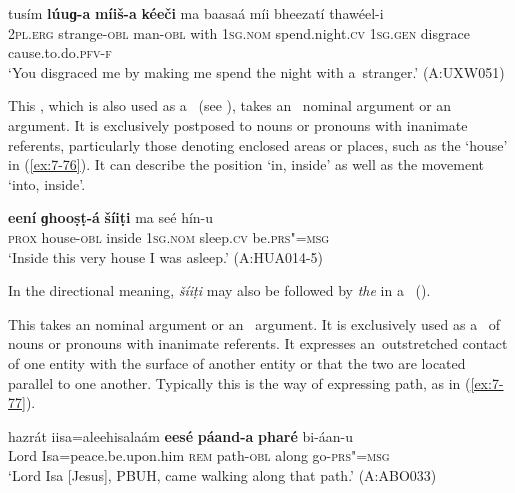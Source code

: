 \begin{exe}
\largerpage
\ea
\label{ex:7-75}
\gll tusím \textbf{lúuɡ-a} \textbf{míiš-a} \textbf{kéeči} ma baasaá míi bheezatí thawéel-i \\
\textsc{2pl.erg} strange-\textsc{obl} man-\textsc{obl} with \textsc{1sg.nom} spend.night.\textsc{cv} \textsc{1sg.gen} disgrace cause.to.do.\textsc{pfv-f} \\
\glt `You disgraced me by making me spend the night with a~stranger.' (A:UXW051)
\z




 This , which is also used as a~ (see ), takes an~ nominal argument or an~  argument. It is exclusively postposed to nouns or pronouns with inanimate referents, particularly those denoting enclosed areas or places, such as the `house' in (\ref{ex:7-76}). It can describe the position `in, inside' as well as the movement `into, inside'.

\begin{exe}
\ex
\label{ex:7-76}
\gll \textbf{eení} \textbf{ɡhooṣṭ-á} \textbf{šíiṭi} ma seé hín-u  \\
\textsc{prox} house-\textsc{obl}  inside \textsc{1sg.nom} sleep.\textsc{cv} be.\textsc{prs"=msg}  \\
\glt `Inside this very house I was asleep.' (A:HUA014-5)
\end{exe}

In the directional meaning, \textit{šíiṭi} may also be followed by \textit{the} in a~ ().


 This  takes an  nominal argument or an~  argument. It is exclusively used as a~ of nouns or pronouns with inanimate referents. It expresses an~outstretched contact of one entity with the surface of another entity or that the two are located parallel to one another. Typically this is the way of expressing path, as in (\ref{ex:7-77}).

\begin{exe}
\ex
\label{ex:7-77}
\gll hazrát iisa=aleehisalaám \textbf{eesé} \textbf{páand-a} \textbf{pharé} bi-áan-u\\
Lord Isa=peace.be.upon.him \textsc{rem} path-\textsc{obl} along go-\textsc{prs"=msg}\\
\glt `Lord Isa [Jesus], PBUH, came walking along that path.' (A:ABO033)
\end{exe}


\end{exe}
